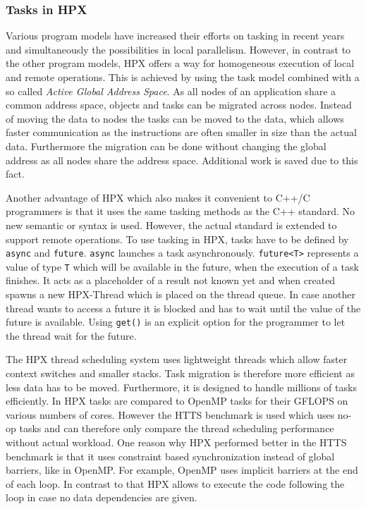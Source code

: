 	
\subsubsection{Tasks in HPX}
  \label{subsubsec:TasksHPX}
  Various program models have increased their efforts on tasking in recent years and simultaneously the possibilities in local parallelism.
  However, in contrast to the other program models, HPX offers a way for homogeneous execution of local and remote operations.
  This is achieved by using the task model combined with a so called \textit{Active Global Address Space}.
  As all nodes of an application share a common address space, objects and tasks can be migrated across nodes.
  Instead of moving the data to nodes the tasks can be moved to the data, which allows faster communication as the instructions are often smaller in size than the actual data.
  Furthermore the migration can be done without changing the global address as all nodes share the address space.
  Additional work is saved due to this fact.~\cite{Kaiser.2014}
  
  Another advantage of HPX which also makes it convenient to C++/C programmers is that it uses the same tasking methods as the C++ standard.
  No new semantic or syntax is used.
  However, the actual standard is extended to support remote operations.
  To use tasking in HPX, tasks have to be defined by \texttt{async} and \texttt{future}.
  \texttt{async} launches a task asynchronously.
  \texttt{future<T>} represents a value of type \texttt{T} which will be available in the future, when the execution of a task finishes.
  It acts as a placeholder of a result not known yet and when created spawns a new HPX-Thread which is placed on the thread queue.
  In case another thread wants to access a future it is blocked and has to wait until the value of the future is available.
  Using \texttt{get()} is an explicit option for the programmer to let the thread wait for the future.~\cite{Kaiser.2014}~\cite{TheSTEARGroup.2020}
  
  
  The HPX thread scheduling system uses lightweight threads which allow faster context switches and smaller stacks.
  Task migration is therefore more efficient as less data has to be moved.
  Furthermore, it is designed to handle millions of tasks efficiently.
  In \cite{Kaiser.2014} HPX tasks are compared to OpenMP tasks for their GFLOPS on various numbers of cores.
  However the HTTS benchmark is used which uses no-op tasks and can therefore only compare the thread scheduling performance without actual workload.
  One reason why HPX performed better in the HTTS benchmark is that it uses constraint based synchronization instead of global barriers, like in OpenMP.
  For example, OpenMP uses implicit barriers at the end of each loop.
  In contrast to that HPX allows to execute the code following the loop in case no data dependencies are given.
  
